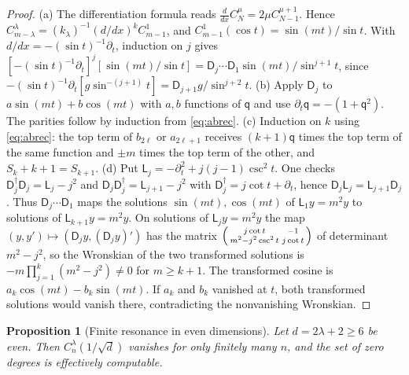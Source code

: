 \documentclass[11pt]{amsart}
\numberwithin{equation}{section}
\newtheorem{proposition}[theorem]{Proposition}
\theoremstyle{definition}
\theoremstyle{remark}
\begin{document}
\begin{proof}
(a) The differentiation formula \cite[(18.9.19)]{DLMF} reads $\frac d{dx}C^\mu_N=2\mu C^{\mu+1}_{N-1}$. Hence $C^{\lambda}_{m-\lambda}=(k_\lambda)^{-1}(d/dx)^kC^1_{m-1}$, and $C^1_{m-1}(\cos t)=\sin(mt)/\sin t$. With $d/dx=-(\sin t)^{-1}\partial_t$, induction on $j$ gives $[-(\sin t)^{-1}\partial_t]^j[\sin(mt)/\sin t]=\mathsf D_j\cdots\mathsf D_1\sin(mt)/\sin^{j+1}t$, since $-(\sin t)^{-1}\partial_t[g\sin^{-(j+1)}t]=\mathsf D_{j+1}g/\sin^{j+2}t$. (b) Apply $\mathsf D_j$ to $a\sin(mt)+b\cos(mt)$ with $a,b$ functions of $\mathsf q$ and use $\partial_t\mathsf q=-(1+\mathsf q^2)$. The parities follow by induction from \eqref{eq:abrec}. (c) Induction on $k$ using \eqref{eq:abrec}: the top term of $b_{2\ell}$ or $a_{2\ell+1}$ receives $(k+1)\mathsf q$ times the top term of the same function and $\pm m$ times the top term of the other, and $S_k+k+1=S_{k+1}$. (d) Put $\mathsf L_j=-\partial_t^2+j(j-1)\csc^2t$. One checks $\mathsf D_j^\dagger\mathsf D_j=\mathsf L_j-j^2$ and $\mathsf D_j\mathsf D_j^\dagger=\mathsf L_{j+1}-j^2$ with $\mathsf D_j^\dagger=j\cot t+\partial_t$, hence $\mathsf D_j\mathsf L_j=\mathsf L_{j+1}\mathsf D_j$. Thus $\mathsf D_j\cdots\mathsf D_1$ maps the solutions $\sin(mt),\cos(mt)$ of $\mathsf L_1y=m^2y$ to solutions of $\mathsf L_{k+1}y=m^2y$. On solutions of $\mathsf L_jy=m^2y$ the map $(y,y')\mapsto(\mathsf D_jy,(\mathsf D_jy)')$ has the matrix $\begin{psmallmatrix}j\cot t&-1\\ m^2-j^2\csc^2t&j\cot t\end{psmallmatrix}$ of determinant $m^2-j^2$, so the Wronskian of the two transformed solutions is $-m\prod_{j=1}^k(m^2-j^2)\ne0$ for $m\ge k+1$. The transformed cosine is $a_k\cos(mt)-b_k\sin(mt)$. If $a_k$ and $b_k$ vanished at $t$, both transformed solutions would vanish there, contradicting the nonvanishing Wronskian.
\end{proof}

\begin{proposition}[Finite resonance in even dimensions]\label{prop:evenres}
Let $d=2\lambda+2\ge6$ be even. Then $C_n^\lambda(1/\sqrt d)$ vanishes for only finitely many $n$, and the set of zero degrees is effectively computable.
\end{proposition}
\end{document}
